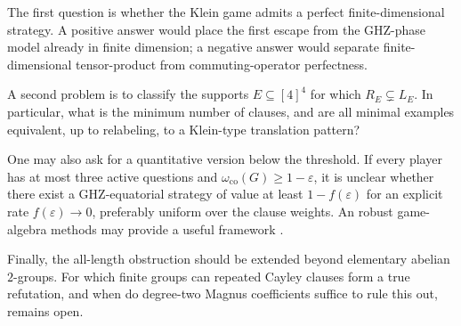 \documentclass[11pt]{article}
\theoremstyle{definition}
\theoremstyle{remark}
\newcommand{\co}{\mathrm{co}}
\numberwithin{equation}{section}
\begin{document}
The first question is whether the Klein game admits a perfect
finite-dimensional strategy.  A positive answer would place the first escape
from the GHZ-phase model already in finite dimension; a negative answer would
separate finite-dimensional tensor-product from commuting-operator
perfectness.

A second problem is to classify the supports \(E\subseteq[4]^4\) for which
\(R_E\subsetneq L_E\).  In particular, what is the minimum number of clauses,
and are all minimal examples equivalent, up to relabeling, to a Klein-type
translation pattern?

One may also ask for a quantitative version below the threshold.  If every
player has at most three active questions and
\(\omega_{\co}(G)\geq1-\varepsilon\), it is unclear whether there exist a GHZ-equatorial
strategy of value at least \(1-f(\varepsilon)\) for an explicit rate
\(f(\varepsilon)\to0\), preferably uniform over the clause weights. An robust game-algebra
methods may provide a useful framework \cite{Zhao2024}.

Finally, the all-length obstruction should be extended beyond elementary
abelian \(2\)-groups.  For which finite groups can repeated Cayley clauses form
a true refutation, and when do degree-two Magnus coefficients suffice to rule
this out, remains open.




\end{document}
